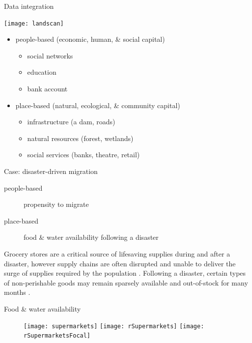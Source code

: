 \documentclass{beamer}
\begin{document}

\begin{frame}{Data integration}
  \begin{center}
    \texttt{[image: landscan]}%
  \end{center}
  \begin{itemize}
  \item people-based (economic, human, \& social capital)
    \begin{itemize}
    \item social networks
    \item education
    \item bank account
    \end{itemize}
  \item place-based (natural, ecological, \& community capital)
    \begin{itemize}
    \item infrastructure (a dam, roads)
    \item natural resources (forest, wetlands)
    \item social services (banks, theatre, retail)
    \end{itemize}
  \end{itemize}
\end{frame}


\begin{frame}{Case: disaster-driven migration}
  \begin{description}
  \item[people-based] propensity to migrate
  \item[place-based] food \& water availability following a disaster
  \end{description}
Grocery stores are a critical source of lifesaving supplies during and after a disaster, however supply chains are often disrupted and unable to deliver the surge of supplies required by the population \cite{palin17}.  Following a disaster, certain types of non-perishable goods may remain sparsely available and out-of-stock for many months \cite{cavallo14}.
\end{frame}


\begin{frame}{Food \& water availability}
  \begin{figure}
  \begin{center}
    \texttt{[image: supermarkets]}%
    \texttt{[image: rSupermarkets]}%
    \texttt{[image: rSupermarketsFocal]}
  \end{center}
  \caption{\cite{openstreetmap}}
  \end{figure}
\end{frame}
\end{document}

